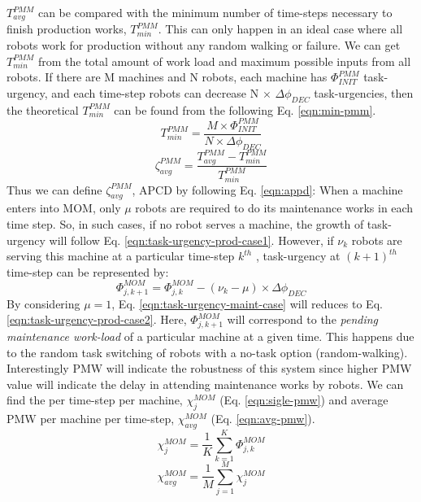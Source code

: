 \documentclass[preprint,12pt]{elsarticle}
\begin{document}
$T_{avg}^{PMM}$ can be compared with the minimum number of time-steps necessary to finish production works, $T_{min}^{PMM}$. This can only happen in an ideal case where all robots work for production without any random walking or failure. We can get $T_{min}^{PMM}$ from the total amount of work load and maximum possible inputs from all robots. If there are M machines and N robots, each machine has $\Phi_{INIT}^{PMM}$ task-urgency, and each time-step robots can decrease N $\times$ $\Delta \phi_{DEC}$ task-urgencies, then the theoretical $T_{min}^{PMM}$ can be found from the following Eq. \ref{eqn:min-pmm}.
%
\begin{equation}
T_{min}^{PMM} = \frac{M \times \Phi_{INIT}^{PMM}}{N \times \Delta \phi_{DEC}} 
\label{eqn:min-pmm}
\end{equation}
\begin{equation}
\zeta_{avg}^{PMM} = \frac{T_{avg}^{PMM} - T_{min}^{PMM}}{T_{min}^{PMM}} 
\label{eqn:appd}
\end{equation}
Thus we can define $\zeta_{avg}^{PMM}$, \acf{APCD} by following Eq. \ref{eqn:appd}:
When a machine enters into MOM, only $\mu$ robots are required to do its maintenance works in each time step. So, in such cases, if no robot serves a machine, the growth of task-urgency will follow Eq. \ref{eqn:task-urgency-prod-case1}. However, if $\nu_{k}$ robots are serving this machine at a particular time-step $k^{th}$ , task-urgency at $(k+1)^{th}$ time-step can be represented by:
\begin{equation}
\Phi_{j, k+1}^{MOM} = \Phi_{j, k}^{MOM}- (\nu_{k} - \mu) \times \Delta \phi_{DEC}
\label{eqn:task-urgency-maint-case}
\end{equation}
By considering $\mu = 1$, Eq. \ref{eqn:task-urgency-maint-case} will reduces to Eq. \ref{eqn:task-urgency-prod-case2}. Here, $\Phi_{j, k+1}^{MOM}$ will correspond to the {\em pending maintenance work-load} of a particular machine at a given time. This happens due to the random task switching of robots with a no-task option (random-walking). Interestingly PMW will indicate the robustness of this system since higher PMW value will indicate the delay in attending maintenance works by robots. We can find the  per time-step per machine, $\chi_{j}^{MOM}$ (Eq. \ref{eqn:sigle-pmw}) and average PMW per machine per time-step, $\chi_{avg}^{MOM}$ (Eq. \ref{eqn:avg-pmw}).
\begin{equation}
\chi_{j}^{MOM}= \frac{1}{K} \sum_{k=1}^{K} \Phi_{j, k}^{MOM}
\label{eqn:sigle-pmw}
\end{equation}
\begin{equation}
\chi_{avg}^{MOM}= \frac{1}{M} \sum_{j=1}^{M} {\chi_{j}^{MOM}}
\label{eqn:avg-pmw}
\end{equation}
\end{document}
